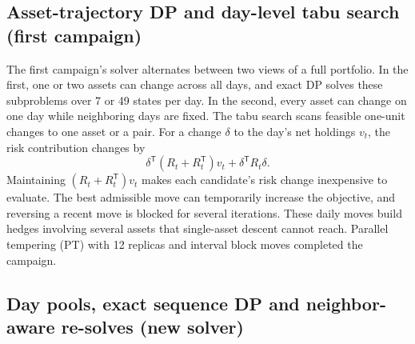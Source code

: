 \documentclass[a4paper]{article}
\begin{document}
\subsection{Asset-trajectory DP and day-level tabu search (first campaign)}

The first campaign's solver alternates between two views of a full portfolio.
In the first, one or two assets can change across all days, and exact DP solves these subproblems over 7 or 49
states per day. In the second, every asset can change on one day while neighboring days are fixed. The tabu search
scans feasible one-unit changes to one asset or a pair. For a change \(\delta\) to the day's net holdings \(v_t\),
the risk contribution changes by
\[
\delta^\mathsf{T}(R_t+R_t^\mathsf{T})v_t+\delta^\mathsf{T}R_t\delta .
\]
Maintaining \((R_t+R_t^\mathsf{T})v_t\) makes each candidate's risk change inexpensive to evaluate.
The best admissible move can temporarily increase the objective, and reversing a recent move is blocked for several iterations.
These daily moves build hedges involving several assets that single-asset descent cannot reach.
Parallel tempering (PT) with 12 replicas and interval block moves completed the campaign.

\subsection{Day pools, exact sequence DP and neighbor-aware re-solves (new solver)}
\end{document}
